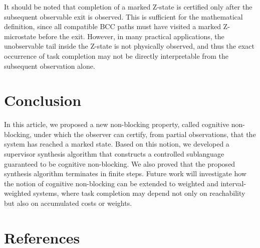 \documentclass[journal,twoside,web]{ieeecolor}
\begin{document}
It should be noted that completion of a marked Z-state is certified only after the subsequent observable exit is observed. 
This is sufficient for the mathematical definition, since all compatible BCC paths must have visited a marked Z-microstate before the exit. 
However, in many practical applications, the unobservable tail inside the Z-state is not physically observed, and thus the exact occurrence of task completion may not be directly interpretable from the subsequent observation alone.

\section{Conclusion}\label{sec:con}

In this article, we proposed a new non-blocking property, called cognitive non-blocking, under which the observer can certify, from partial observations, that the system has reached a marked state.
Based on this notion, we developed a supervisor synthesis algorithm that constructs a controlled sublanguage guaranteed to be cognitive non-blocking. 
We also proved that the proposed synthesis algorithm terminates in finite steps. 
%
Future work will investigate how the notion of cognitive non-blocking can be extended to weighted and interval-weighted systems, where task completion may depend not only on reachability but also on accumulated
costs or weights.

\section*{References}\vspace{-1em}


\end{document}
